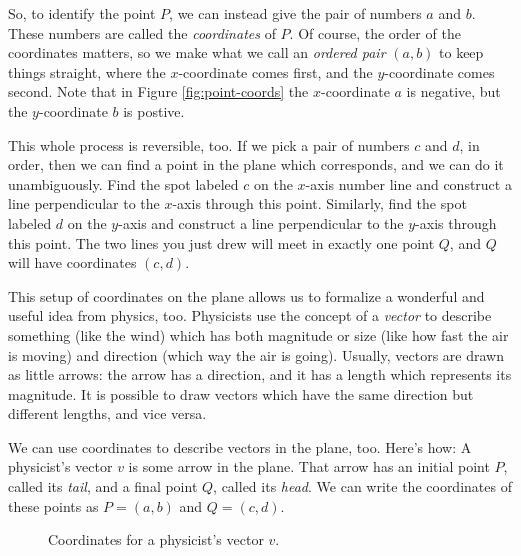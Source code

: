 \documentclass[elementsmain.tex]{subfiles}
\begin{document}
So, to identify the point $P$, we can instead give the pair of numbers $a$ and $b$.
These numbers are called the \emph{coordinates} of $P$.
Of course, the order of the coordinates matters, so we make what we call an \emph{ordered pair} $(a,b)$ to keep things straight, where the $x$-coordinate comes first, and the $y$-coordinate comes second. Note that in Figure \ref{fig:point-coords} the $x$-coordinate $a$ is negative, but the $y$-coordinate $b$ is postive.

This whole process is reversible, too. If we pick a pair of numbers $c$ and $d$, in order, then we can find a point in the plane which corresponds, and we can do it unambiguously. Find the spot labeled $c$ on the $x$-axis number line and construct a line perpendicular to the $x$-axis through this point. Similarly, find the spot labeled $d$ on the $y$-axis and construct a line perpendicular to the $y$-axis through this point. The two lines you just drew will meet in exactly one point $Q$, and $Q$ will have coordinates $(c,d)$.

This setup of coordinates on the plane allows us to formalize a wonderful and useful idea from physics, too.
Physicists use the concept of a \emph{vector} to describe something (like the wind) which has both magnitude or size (like how fast the air is moving)  and direction (which way the air is going).
Usually, vectors are drawn as little arrows: the arrow has a direction, and it has a length which represents its magnitude.
It is possible to draw vectors which have the same direction but different lengths, and vice versa.

We can use coordinates to describe vectors in the plane, too.
Here's how: A physicist's vector $v$ is some arrow in the plane.
That arrow has an initial point $P$, called its \emph{tail}, and a final point $Q$, called its \emph{head}.
We can write the coordinates of these points as $P = (a,b)$ and $Q = (c,d)$.

\begin{figure}[h]
\centering
{}
\caption{Coordinates for a physicist's vector $v$.}
\label{fig:phys-vec-coords}
\end{figure}
\end{document}
